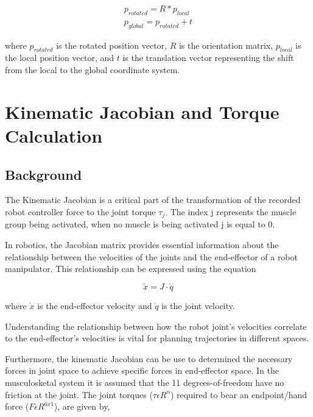 \begin{equation}
\begin{aligned}
    p_{rotated} = R*p_{local} \\
    p_{global} = p_{rotated} + t
\end{aligned}
\end{equation}

where $p_{rotated}$ is the rotated position vector, $R$ is the orientation matrix, $p_{local}$ is the local position vector, and $t$ is the translation vector representing the shift from the local to the global coordinate system.


\newpage
\section{Kinematic Jacobian and Torque Calculation} \label{sec:torque} 

\subsection{Background} 

The Kinematic Jacobian is a critical part of the transformation of the recorded robot controller force to the joint torque $\tau_j$. The index j represents the muscle group being activated, when no muscle is being activated j is equal to 0.

In robotics, the Jacobian matrix provides essential information about the relationship between the velocities of the joints and the end-effector of a robot manipulator. This relationship can be expressed using the equation

\begin{equation}
\dot{x} = J \cdot \dot{q}
\end{equation}

where $\dot{x}$ is the end-effector velocity and $\dot{q}$ is the joint velocity.

Understanding the relationship between how the robot joint's velocities correlate to the end-effector's velocities is vital for planning trajectories in different spaces.

Furthermore, the kinematic Jacobian can be use to determined the necessary forces in joint space to achieve specific forces in end-effector space. In the musculosketal system it is assumed that the 11 degrees-of-freedom have no friction at the joint. The joint torques ($ \tau \epsilon R^n$) required to bear an endpoint/hand force ($F \epsilon R^{6x1}$), are given by,

